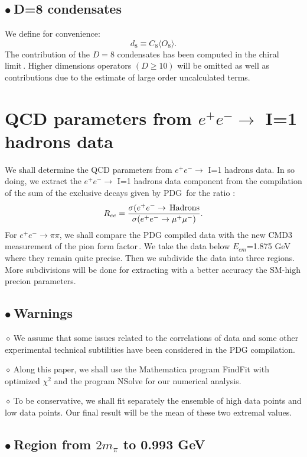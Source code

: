 \documentclass[review]{elsarticle}
\def\beq{\begin{equation}}
\def\eeq{\end{equation}}
\def\la{\langle}
\def\ra{\rangle}
\def\b{$\bullet~$}
\def\d{$\diamond~$}
\begin{document}
\subsection*{\b  D=8  condensates }
We define for convenience:
\beq
d_8\equiv  C_8\la O_8\ra.
\label{eq:d8}
\eeq
The contribution of the $D=8$ condensates has been computed in the chiral limit\,\cite{BROAD8}. Higher dimensions operators $(D\geq 10)$ will be omitted as well as contributions due to the estimate of large order uncalculated terms. 

\section{QCD parameters from $e^+e^-\to$ I=1 hadrons data }
We shall determine the QCD  parameters from $e^+e^-\to$ I=1 hadrons data. In so doing, 
we extract the $e^+e^-\to$ I=1 hadrons data component  from   the compilation of the sum of the exclusive decays given by PDG\,\cite{PDG} for the ratio :
\beq
R_{ee}=\frac{\sigma(e^+e^-\to\,{\rm Hadrons}}{\sigma(e^+e^-\to\mu^+\mu^-)}.
\label{eq:Ree}
\eeq
For $e^+e^-\to \pi\pi$, we shall compare the PDG compiled data with the new CMD3 measurement of the pion form factor\,\cite{CMD3}. We take the data below $E_{cm}$=1.875 GeV where they remain quite precise. Then we subdivide the data into three regions. More subdivisions will be done for extracting with a better accuracy the SM-high precion parameters.
\subsection*{\b Warnings}
\d We assume that some issues related to the correlations of data and some other experimental technical subtilities  have been considered in the PDG compilation. 

\d Along this paper, we shall use the Mathematica program FindFit with optimized $\chi^2$ and the program NSolve for our numerical analysis. 

\d To be conservative, we shall fit separately the ensemble of high data points and low data points. Our final result will be the mean of these two extremal values. 
\subsection*{\b Region from $2m_\pi$ to   0.993 GeV}
\end{document}
